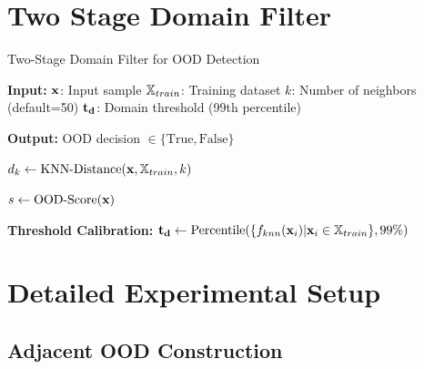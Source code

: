 \documentclass[letterpaper]{article} %
\theoremstyle{plain}
\theoremstyle{definition}
\theoremstyle{remark}
\begin{document}
\section{Two Stage Domain Filter}

\label{twostageapp}

\begin{algorithm}[H]
\caption{Two-Stage Domain Filter for OOD Detection}
\label{twostage}
\begin{algorithmic}[1]
\State \textbf{Input:} 
    \State ${\mathbf{x}}$: Input sample
    \State ${\mathbb{X}}_{train}$: Training dataset
    \State $k$: Number of neighbors (default=50)
    \State ${\mathbf{t}}_{\mathbf{d}}$: Domain threshold (99th percentile)

\State \textbf{Output:}
    \State OOD decision $\in \{\text{True}, \text{False}\}$

    \State $d_k \gets \text{KNN-Distance}({\mathbf{x}}, {\mathbb{X}}_{train}, k)$ 
        \State \Return {} 
    \Else
        \State \Return {} 
    \EndIf
\EndProcedure

    \State {}
        \State \Return {} 
    \EndIf
    
    \State {}
    \State $s \gets \text{OOD-Score}({\mathbf{x}})$ 
     
        \State \Return {}
    \Else
        \State \Return {}
    \EndIf
\EndProcedure

\State \textbf{Threshold Calibration:}
\State ${\mathbf{t}}_{\mathbf{d}} \gets \text{Percentile}(\{f_{knn}({\mathbf{x}}_i) | {\mathbf{x}}_i \in {\mathbb{X}}_{train}\}, 99\%)$

\end{algorithmic}
\end{algorithm}


\section{Detailed Experimental Setup}

\label{setup}

\subsection{Adjacent OOD Construction}
\end{document}
